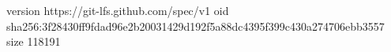 version https://git-lfs.github.com/spec/v1
oid sha256:3f28430ff9fdad96e2b20031429d192f5a88dc4395f399c430a274706ebb3557
size 118191
